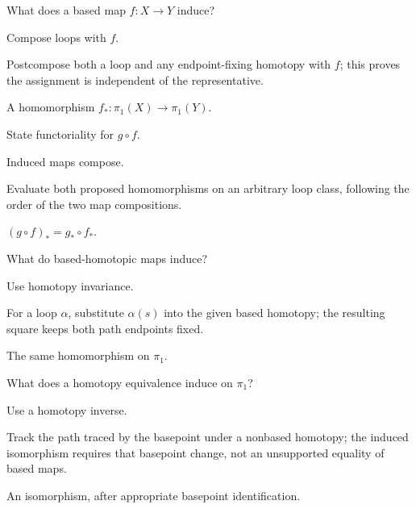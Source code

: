\begin{exercise}\label{exr:viii09-17}
What does a based map \(f:X\to Y\) induce?
\end{exercise}
\begin{hint}
Compose loops with \(f\).

Postcompose both a loop and any endpoint-fixing homotopy with \(f\); this proves the assignment is independent of the representative.
\end{hint}
\begin{solution}
A homomorphism \(f_*:\pi_1(X)\to\pi_1(Y)\).
\end{solution}

\begin{exercise}\label{exr:viii09-18}
State functoriality for \(g\circ f\).
\end{exercise}
\begin{hint}
Induced maps compose.

Evaluate both proposed homomorphisms on an arbitrary loop class, following the order of the two map compositions.
\end{hint}
\begin{solution}
\((g\circ f)_*=g_*\circ f_*\).
\end{solution}

\begin{exercise}\label{exr:viii09-19}
What do based-homotopic maps induce?
\end{exercise}
\begin{hint}
Use homotopy invariance.

For a loop \(\alpha\), substitute \(\alpha(s)\) into the given based homotopy; the resulting square keeps both path endpoints fixed.
\end{hint}
\begin{solution}
The same homomorphism on \(\pi_1\).
\end{solution}

\begin{exercise}\label{exr:viii09-20}
What does a homotopy equivalence induce on \(\pi_1\)?
\end{exercise}
\begin{hint}
Use a homotopy inverse.

Track the path traced by the basepoint under a nonbased homotopy; the induced isomorphism requires that basepoint change, not an unsupported equality of based maps.
\end{hint}
\begin{solution}
An isomorphism, after appropriate basepoint identification.
\end{solution}

